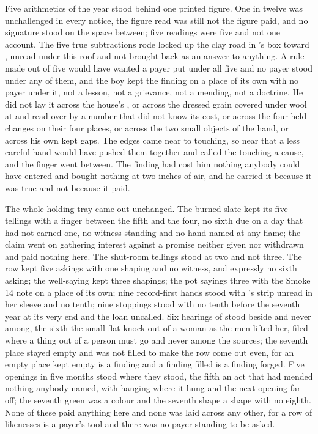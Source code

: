 Five arithmetics of the year stood behind one printed figure. One in twelve was unchallenged in every notice, the figure read was still not the figure paid, and no signature stood on the space between; five readings were five and not one account. The five true subtractions rode locked up the clay road in 's box toward , unread under this roof and not brought back as an answer to anything. A rule made out of five would have wanted a payer put under all five and no payer stood under any of them, and the boy kept the finding on a place of its own with no payer under it, not a lesson, not a grievance, not a mending, not a doctrine. He did not lay it across the house's , or across the dressed grain covered under wool at  and read over by a number that did not know its cost, or across the four held changes on their four places, or across the two small objects of the hand, or across his own kept gaps. The edges came near to touching, so near that a less careful hand would have pushed them together and called the touching a cause, and the finger went between. The finding had cost him nothing anybody could have entered and bought nothing at two inches of air, and he carried it because it was true and not because it paid.

The whole holding tray came out unchanged. The burned slate kept its five tellings with a finger between the fifth and the four, no sixth due on a day that had not earned one, no witness standing and no hand named at any flame; the claim went on gathering interest against a promise neither given nor withdrawn and paid nothing here. The shut-room tellings stood at two and not three. The row kept five askings with one shaping and no witness, and expressly no sixth asking; the well-saying kept three shapings; the pot sayings three with the Smoke 14 note on a place of its own; nine record-first hands stood with 's strip unread in her sleeve and no tenth; nine stoppings stood with no tenth before the seventh year at its very end and the loan uncalled. Six hearings of  stood beside and never among, the sixth the small flat knock out of a woman as the men lifted her, filed where a thing out of a person must go and never among the sources; the seventh place stayed empty and was not filled to make the row come out even, for an empty place kept empty is a finding and a finding filled is a finding forged. Five openings in five months stood where they stood, the fifth an act that had mended nothing anybody named, with  hanging where it hung and the next opening far off; the seventh green was a colour and the seventh shape a shape with no eighth. None of these paid anything here and none was laid across any other, for a row of likenesses is a payer's tool and there was no payer standing to be asked.

